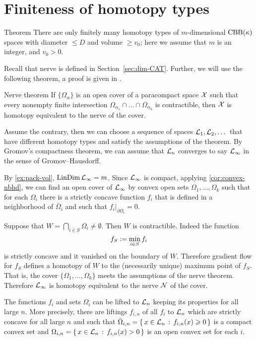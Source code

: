 \section{Finiteness of homotopy types}

\begin{thm}{Theorem}\label{thm:h-finiteness}
There are only finitely many homotopy types of $m$-dimensional $\mathrm{CBB}(\kappa)$ spaces with diameter $\le D$ and volume $\ge v_0$;
here we assume that $m$ is an integer, and $v_0>0$.
\end{thm}

Recall that nerve is defined in Section~\ref{sec:dim-CAT}.
Further, we will use the following theorem,
a proof is given in \cite[4G.3]{hatcher}.

\begin{thm}{Nerve theorem}
If $\{\Omega_\alpha\}$ is an open cover of a paracompact space $\mathcal{X}$ such that every
nonempty finite intersection $\Omega_{\alpha_1}\cap\dots\cap\Omega_{\alpha_k}$ is contractible, then $\mathcal{X}$ is homotopy equivalent to the nerve of the cover.
\end{thm}


Assume the contrary, then we can choose a sequence of spaces $\mathcal{L}_1,\mathcal{L}_2,\dots$ that have different homotopy types and satisfy the assumptions of the theorem.
By Gromov's compactness theorem, we can assume that $\mathcal{L}_n$ converges to say $\mathcal{L}_\infty$ in the sense of Gromov--Hausdorff.


By \ref{ex:pack-vol}, $\mathop{\rm LinDim}\nolimits \mathcal{L}_\infty=m$.
Since $\mathcal{L}_\infty$ is compact, applying \ref{cor:convex-nbhd}, we can find an open cover of $\mathcal{L}_\infty$  by convex open sets $\Omega_1,\dots, \Omega_k$ such that 
for each $\Omega_i$ there is a strictly concave function $f_i$ that is defined in a neighborhood of $\bar \Omega_i$ and such that $f_i|_{\partial \Omega_i}=0$.

Suppose that $W=\bigcap_{i\in S}\Omega_{i}\ne \emptyset$.
Then $W$ is contractible.
Indeed the function 
\[f_S\mathrel{:=}\min_{i\in S} f_i\]
is strictly concave and it vanished on the boundary of $W$.
Therefore gradient flow for $f_S$ defines a homotopy of $W$ to the (necessarily unique) maximum point of $f_S$.
That is, the cover $\{\Omega_1,\dots, \Omega_k\}$ meets the assumptions of the nerve theorem.
Therefore $\mathcal{L}_\infty$ is homotopy equivalent to the nerve $\mathcal{N}$ of the cover.

The functions $f_i$ and sets $\Omega_i$ can be lifted to $\mathcal{L}_n$ keeping its properties for all large $n$. 
More precisely, there are liftings $f_{i,n}$ of all $f_i$ to $\mathcal{L}_n$ which are strictly concave for all large $n$ and such that $\bar\Omega_{i,n}=\left\{\,{x\in \mathcal{L}_n}\,:\,{f_{i,n}(x)\geqslant 0}\,\right\}$ is a compact convex set and $\Omega_{i,n}\z=\set{x\in \spc{L}_n}{f_{i,n}(x)> 0}$ is an open convex set for each $i$.

